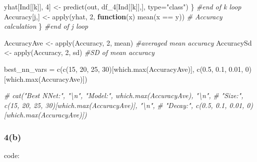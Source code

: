 \documentclass[
]{article}
\newenvironment{Shaded}{\begin{snugshade}}{\end{snugshade}}
\newcommand{\AttributeTok}[1]{\textcolor[rgb]{0.77,0.63,0.00}{#1}}
\newcommand{\CommentTok}[1]{\textcolor[rgb]{0.56,0.35,0.01}{\textit{#1}}}
\newcommand{\ControlFlowTok}[1]{\textcolor[rgb]{0.13,0.29,0.53}{\textbf{#1}}}
\newcommand{\DecValTok}[1]{\textcolor[rgb]{0.00,0.00,0.81}{#1}}
\newcommand{\FloatTok}[1]{\textcolor[rgb]{0.00,0.00,0.81}{#1}}
\newcommand{\FunctionTok}[1]{\textcolor[rgb]{0.00,0.00,0.00}{#1}}
\newcommand{\NormalTok}[1]{#1}
\newcommand{\OtherTok}[1]{\textcolor[rgb]{0.56,0.35,0.01}{#1}}
\newcommand{\SpecialCharTok}[1]{\textcolor[rgb]{0.00,0.00,0.00}{#1}}
\newcommand{\StringTok}[1]{\textcolor[rgb]{0.31,0.60,0.02}{#1}}
\begin{document}
\begin{Shaded}
\begin{Highlighting}[]
\NormalTok{    yhat[Ind[[k]], }\DecValTok{4}\NormalTok{] }\OtherTok{\textless{}{-}} \FunctionTok{predict}\NormalTok{(out, df\_4[Ind[[k]],], }\AttributeTok{type=}\StringTok{"class"}\NormalTok{)}
\NormalTok{  \} }\CommentTok{\#end of k loop}
\NormalTok{  Accuracy[j,] }\OtherTok{\textless{}{-}} \FunctionTok{apply}\NormalTok{(yhat, }\DecValTok{2}\NormalTok{, }\ControlFlowTok{function}\NormalTok{(x) }\FunctionTok{mean}\NormalTok{(x }\SpecialCharTok{==}\NormalTok{ y)) }\CommentTok{\# Accuracy calculation}
\NormalTok{\} }\CommentTok{\#end of j loop}

\NormalTok{AccuracyAve }\OtherTok{\textless{}{-}} \FunctionTok{apply}\NormalTok{(Accuracy, }\DecValTok{2}\NormalTok{, mean) }\CommentTok{\#averaged mean accuracy}
\NormalTok{AccuracySd }\OtherTok{\textless{}{-}} \FunctionTok{apply}\NormalTok{(Accuracy, }\DecValTok{2}\NormalTok{, sd)  }\CommentTok{\#SD of mean accuracy}

\NormalTok{best\_nn\_vars }\OtherTok{=} \FunctionTok{c}\NormalTok{(}\FunctionTok{c}\NormalTok{(}\DecValTok{15}\NormalTok{, }\DecValTok{20}\NormalTok{, }\DecValTok{25}\NormalTok{, }\DecValTok{30}\NormalTok{)[}\FunctionTok{which.max}\NormalTok{(AccuracyAve)], }\FunctionTok{c}\NormalTok{(}\FloatTok{0.5}\NormalTok{, }\FloatTok{0.1}\NormalTok{, }\FloatTok{0.01}\NormalTok{, }\DecValTok{0}\NormalTok{)[}\FunctionTok{which.max}\NormalTok{(AccuracyAve)])}

\CommentTok{\# cat("Best NNet:", "\textbackslash{}n", "Model:", which.max(AccuracyAve), "\textbackslash{}n", }
\CommentTok{\#     "Size:", c(15, 20, 25, 30)[which.max(AccuracyAve)], "\textbackslash{}n", }
\CommentTok{\#     "Decay:", c(0.5, 0.1, 0.01, 0)[which.max(AccuracyAve)])}
\end{Highlighting}
\end{Shaded}

\hypertarget{b-7}{%
\subsubsection{4(b)}\label{b-7}}

code:
\end{document}
